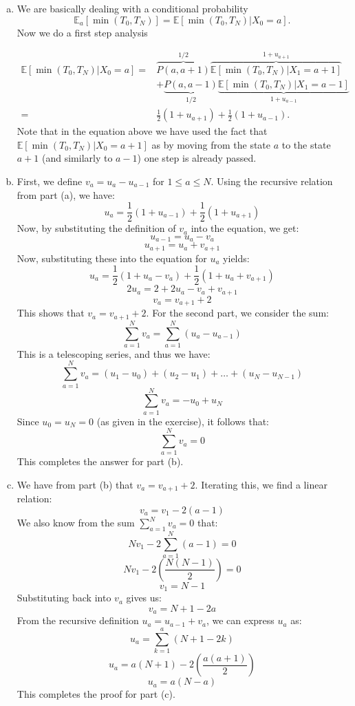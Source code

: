 \begin{solution}
	\begin{enumerate}[(a)]
		\item 
		We are basically dealing with a conditional probability
		\[ \mathbb{E}_a[\min(T_0, T_N)] = \mathbb{E}[\min(T_0,T_N)|X_0 = a]. \]
		Now we do a first step analysis
		
		
		\begin{equation*}
			\begin{split}
				\mathbb{E}[\min(T_0,T_N)|X_0=a] = &  \overbrace{P(a,a+1)}^{1/2}\overbrace{\mathbb{E}[\min(T_0,T_N)|X_1=a+1]}^{1+u_{a+1}} \\
				& + \underbrace{P(a,a-1)}_{1/2}\underbrace{\mathbb{E}[\min(T_0,T_N)|X_1=a-1]}_{1+u_{a-1}} \\
				= &\frac{1}{2}(1+u_{a+1}) + \frac{1}{2}(1+u_{a-1}).
			\end{split}
		\end{equation*}
		Note that in the equation above we have used the fact that $\mathbb{E}[\min(T_0,T_N)|X_0=a+1]$ as by moving from the state $a$ to the state $a+1$ (and similarly to $a-1$) one step is already passed. 
		
		\item 
		First, we define \( v_a = u_a - u_{a-1} \) for \( 1 \leq a \leq N \). Using the recursive relation from part (a), we have:
		\[ u_a = \frac{1}{2}(1 + u_{a-1}) + \frac{1}{2}(1 + u_{a+1}) \]
		Now, by substituting the definition of \( v_a \) into the equation, we get:
		\[ u_{a-1} = u_a - v_a \]
		\[ u_{a+1} = u_a + v_{a+1} \]
		Now, substituting these into the equation for \( u_a \) yields:
		\[ u_a = \frac{1}{2}(1 + u_a - v_a) + \frac{1}{2}(1 + u_a + v_{a+1}) \]
		\[ 2u_a = 2 + 2u_a - v_a + v_{a+1} \]
		\[ v_a = v_{a+1} + 2 \]
		This shows that \( v_a = v_{a+1} + 2 \).
		For the second part, we consider the sum:
		\[ \sum_{a=1}^{N} v_a = \sum_{a=1}^{N} (u_a - u_{a-1}) \]
		This is a telescoping series, and thus we have:
		\[ \sum_{a=1}^{N} v_a = (u_1 - u_0) + (u_2 - u_1) + \ldots + (u_N - u_{N-1}) \]
		\[ \sum_{a=1}^{N} v_a = -u_0 + u_N \]
		Since \( u_0 = u_N = 0 \) (as given in the exercise), it follows that:
		\[ \sum_{a=1}^{N} v_a = 0 \]
		This completes the answer for part (b).
		
		
		\item
		We have from part (b) that \( v_a = v_{a+1} + 2 \). Iterating this, we find a linear relation:
		\[ v_a = v_1 - 2(a - 1) \]
		We also know from the sum \( \sum_{a=1}^{N} v_a = 0 \) that:
		\[ Nv_1 - 2\sum_{a=1}^{N} (a - 1) = 0 \]
		\[ Nv_1 - 2\left(\frac{N(N - 1)}{2}\right) = 0 \]
		\[ v_1 = N - 1 \]
		Substituting back into \( v_a \) gives us:
		\[ v_a = N + 1 - 2a \]
		From the recursive definition \( u_a = u_{a-1} + v_a \), we can express \( u_a \) as:
		\[ u_a = \sum_{k=1}^{a} (N + 1 - 2k) \]
		\[ u_a = a(N + 1) - 2\left(\frac{a(a + 1)}{2}\right) \]
		\[ u_a = a(N - a) \]
		This completes the proof for part (c).
		

\end{enumerate}
\end{solution}
